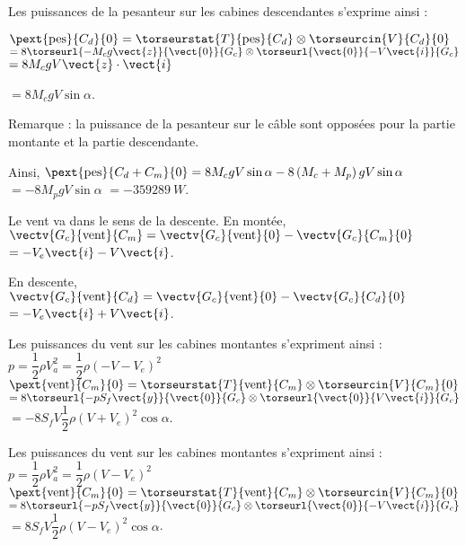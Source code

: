 \begin{multicols}{2}
\begin{corrige}
Les puissances de la pesanteur sur les cabines descendantes s'exprime ainsi : 

$\pext{\text{pes}}{C_d}{0} = \torseurstat{T}{\text{pes}}{C_d} \otimes \torseurcin{V}{C_d}{0}$
$ = 8 \torseurl{-M_c g \vect{z}}{\vect{0}}{G_c} \otimes \torseurl{\vect{0}}{-V\vect{i}}{G_c}	$
$ = 8M_cgV\vect{z} \cdot \vect{i}$

$ = 8M_c gV \sin \alpha$.

Remarque : la puissance de la pesanteur sur le câble sont opposées pour la partie montante et la partie descendante.


Ainsi, $\pext{\text{pes}}{C_d+C_m}{0}=8M_c gV \sin \alpha -8\left(M_c+M_p\right)gV \sin \alpha$ 
$=-8M_pgV \sin \alpha$
$=\SI{-359289}{W}$.

\end{corrige}\else\fi


\ifprof\begin{corrige}

Le vent va dans le sens de la descente.  En montée, 
$\vectv{G_c}{\text{vent}}{C_m}=\vectv{G_c}{\text{vent}}{0}-\vectv{G_c}{C_m}{0}$ $=-V_e\vect{i} - V\vect{i}$.

En descente, 
$\vectv{G_c}{\text{vent}}{C_d}=\vectv{G_c}{\text{vent}}{0}-\vectv{G_c}{C_d}{0}$ $=-V_e\vect{i} + V\vect{i}$.

Les puissances du vent  sur les cabines montantes s'expriment ainsi : 
$p = \dfrac{1}{2}\rho V_a^2 = \dfrac{1}{2}\rho \left(-V-V_e\right)^2 $
$\pext{\text{vent}}{C_m}{0} = \torseurstat{T}{\text{vent}}{C_m} \otimes \torseurcin{V}{C_m}{0}$
$ = 8 \torseurl{-pS_f\vect{y}}{\vect{0}}{G_c} \otimes \torseurl{\vect{0}}{V\vect{i}}{G_c}	$
$ = -8S_fV\dfrac{1}{2}\rho \left(V+V_e\right)^2 \cos\alpha$.


Les puissances du vent  sur les cabines montantes s'expriment ainsi : 
$p = \dfrac{1}{2}\rho V_a^2 = \dfrac{1}{2}\rho \left(V-V_e\right)^2 $
$\pext{\text{vent}}{C_m}{0} = \torseurstat{T}{\text{vent}}{C_m} \otimes \torseurcin{V}{C_m}{0}$
$ = 8 \torseurl{-pS_f\vect{y}}{\vect{0}}{G_c} \otimes \torseurl{\vect{0}}{-V\vect{i}}{G_c}	$
$ =8S_fV\dfrac{1}{2}\rho \left(V-V_e\right)^2 \cos\alpha$.


\end{corrige}
\end{multicols}

